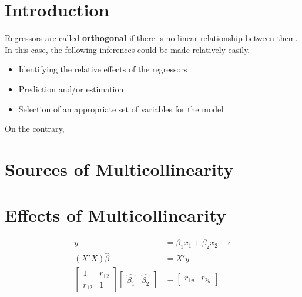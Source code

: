 \documentclass[12pt]{article}
\begin{document}
\section{Introduction}

Regressors are called \textbf{orthogonal} if there is no linear relationship between them. In this case, the following inferences could be made relatively easily. 

\begin{itemize}
	\item Identifying the relative effects of the regressors
	\item Prediction and/or estimation
	\item Selection of an appropriate set of variables for the model
\end{itemize}

On the contrary, 


\section{Sources of Multicollinearity}




\section{Effects of Multicollinearity}


$$
\begin{aligned}
y &= \beta_1 x_1 + \beta_2 x_2 + \epsilon \\[10pt]
(X'X)\hat{\beta} &= X'y \\[8pt]
\begin{bmatrix} 1 & r_{12} \\ r_{12} & 1 \end{bmatrix} \begin{bmatrix} \hat{\beta_1} & \hat{\beta_2} \end{bmatrix} &= \begin{bmatrix} r_{1y} & r_{2y} \end{bmatrix}
\end{aligned}
$$
\end{document}
